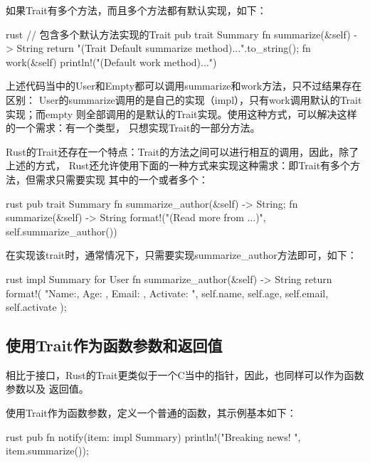 如果Trait有多个方法，而且多个方法都有默认实现，如下：
\begin{code-block}{rust}
// 包含多个默认方法实现的Trait
pub trait Summary {
    fn summarize(&self) -> String {
        return "(Trait Default summarize method)...".to_string();
    }
    fn work(&self) {
        println!("(Default work method)...")
    }
}
\end{code-block}

上述代码当中的User和Empty都可以调用summarize和work方法，只不过结果存在区别：
User的summarize调用的是自己的实现（impl），只有work调用默认的Trait实现；而empty
则全部调用的是默认的Trait实现。使用这种方式，可以解决这样的一个需求：有一个类型，
只想实现Trait的一部分方法。

Rust的Trait还存在一个特点：Trait的方法之间可以进行相互的调用，因此，除了上述的方式，
Rust还允许使用下面的一种方式来实现这种需求：即Trait有多个方法，但需求只需要实现
其中的一个或者多个：
\begin{code-block}{rust}
pub trait Summary {
    fn summarize_author(&self) -> String;
    fn summarize(&self) -> String {
        format!("(Read more from {}...)", self.summarize_author())
    }
}
\end{code-block}
在实现该trait时，通常情况下，只需要实现summarize\_author方法即可，如下：
\begin{code-block}{rust}
impl Summary for User {
    fn summarize_author(&self) -> String {
        return format!(
            "Name:{}, Age: {}, Email: {}, Activate: {}",
            self.name, self.age, self.email, self.activate
        );
    }
}
\end{code-block}

\subsection{使用Trait作为函数参数和返回值}
相比于接口，Rust的Trait更类似于一个C当中的指针，因此，也同样可以作为函数参数以及
返回值。

使用Trait作为函数参数，定义一个普通的函数，其示例基本如下：
\begin{code-block}{rust}
pub fn notify(item: impl Summary) {
    println!("Breaking news! {}", item.summarize());
}
\end{code-block}

